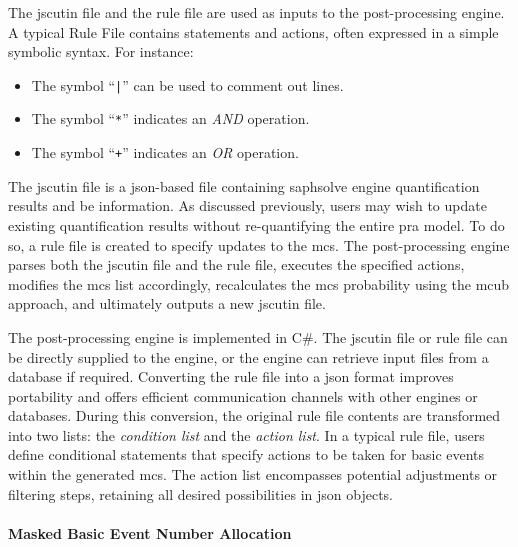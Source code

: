 



The \acrshort{jscutin} file and the rule file are used as inputs to the post-processing engine. A typical Rule File contains statements and actions, often expressed in a simple symbolic syntax. For instance:
\begin{itemize}
    \item The symbol ``\texttt{|}'' can be used to comment out lines.
    \item The symbol ``\texttt{*}'' indicates an \emph{AND} operation.
    \item The symbol ``\texttt{+}'' indicates an \emph{OR} operation.
\end{itemize}
The \acrshort{jscutin} file is a \acrshort{json}-based file containing \acrshort{saphsolve} engine quantification results and \acrlong{be} information. As discussed previously, users may wish to update existing quantification results without re-quantifying the entire \acrshort{pra} model. To do so, a rule file is created to specify updates to the \acrshort{mcs}. The post-processing engine parses both the \acrshort{jscutin} file and the rule file, executes the specified actions, modifies the \acrshort{mcs} list accordingly, recalculates the \acrshort{mcs} probability using the \acrshort{mcub} approach, and ultimately outputs a new \acrshort{jscutin} file.

The post-processing engine is implemented in C\#. The \acrshort{jscutin} file or rule file can be directly supplied to the engine, or the engine can retrieve input files from a database if required. Converting the rule file into a \acrshort{json} format improves portability and offers efficient communication channels with other engines or databases. During this conversion, the original rule file contents are transformed into two lists: the \emph{condition list} and the \emph{action list}. In a typical rule file, users define conditional statements that specify actions to be taken for basic events within the generated \acrshort{mcs}. The action list encompasses potential adjustments or filtering steps, retaining all desired possibilities in \acrshort{json} objects.

\paragraph{Masked Basic Event Number Allocation}

